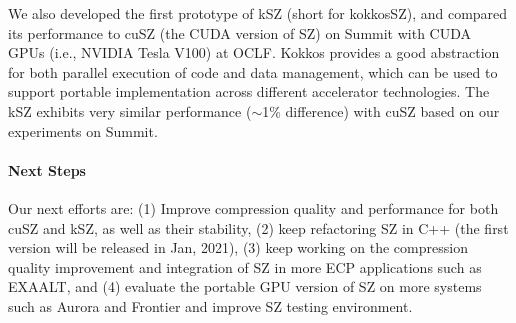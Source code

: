 We also developed the first prototype of kSZ (short for kokkosSZ), and compared its performance to cuSZ (the CUDA version of SZ) on Summit with CUDA GPUs (i.e., NVIDIA Tesla V100) at OCLF. Kokkos provides a good abstraction for both parallel execution of code and data management, which can be used to support portable implementation across different accelerator technologies. The kSZ exhibits very similar performance ($\sim$1\% difference) with cuSZ based on our experiments on Summit.


\paragraph{Next Steps} Our next efforts are: (1) Improve compression quality and performance for both cuSZ and kSZ, as well as their stability, (2) keep refactoring SZ in C++ (the first version will be released in Jan, 2021), (3) keep working on the compression quality improvement and integration of SZ in more ECP applications such as EXAALT, and (4) evaluate the portable GPU version of SZ on more systems such as Aurora and Frontier and improve SZ testing environment.

